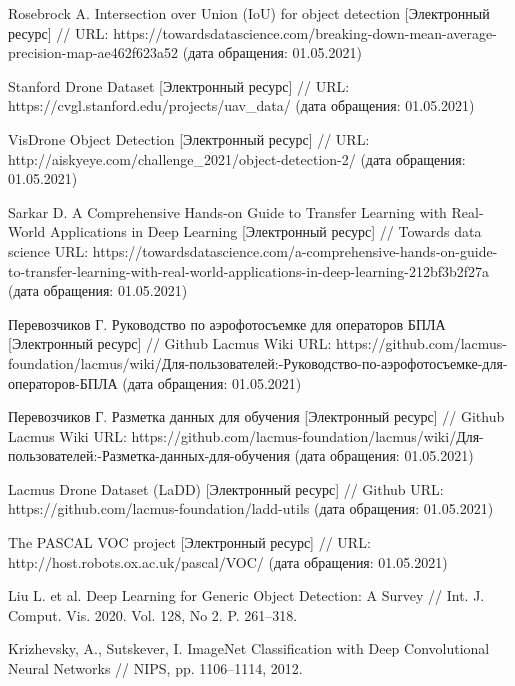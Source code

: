 \begin{thebibliography}{00}
    Rosebrock A. Intersection over Union (IoU) for object detection
    [Электронный ресурс] //
    URL: https://towardsdatascience.com/breaking-down-mean-average-precision-map-ae462f623a52
    (дата обращения: 01.05.2021)

    Stanford Drone Dataset
    [Электронный ресурс] //
    URL: https://cvgl.stanford.edu/projects/uav\_data/
    (дата обращения: 01.05.2021)

    VisDrone Object Detection
    [Электронный ресурс] //
    URL: http://aiskyeye.com/challenge\_2021/object-detection-2/
    (дата обращения: 01.05.2021)

    Sarkar D. A Comprehensive Hands-on Guide to Transfer Learning with Real-World Applications in Deep Learning
    [Электронный ресурс] //
    Towards data science
    URL: https://towardsdatascience.com/a-comprehensive-hands-on-guide-to-transfer-learning-with-real-world-applications-in-deep-learning-212bf3b2f27a
    (дата обращения: 01.05.2021)

    Перевозчиков Г. Руководство по аэрофотосъемке для операторов БПЛА
    [Электронный ресурс] //
    Github Lacmus Wiki
    URL: https://github.com/lacmus-foundation/lacmus/wiki/Для-пользователей:-Руководство-по-аэрофотосъемке-для-операторов-БПЛА
    (дата обращения: 01.05.2021)

    Перевозчиков Г. Разметка данных для обучения
    [Электронный ресурс] //
    Github Lacmus Wiki
    URL: https://github.com/lacmus-foundation/lacmus/wiki/Для-пользователей:-Разметка-данных-для-обучения
    (дата обращения: 01.05.2021)

    Lacmus Drone Dataset (LaDD)
    [Электронный ресурс] //
    Github
    URL: https://github.com/lacmus-foundation/ladd-utils
    (дата обращения: 01.05.2021)    

    The PASCAL VOC project
    [Электронный ресурс] //  
    URL: http://host.robots.ox.ac.uk/pascal/VOC/
    (дата обращения: 01.05.2021)

    Liu L. et al. 
    Deep Learning for Generic Object Detection: A Survey //
    Int. J. Comput. Vis. 2020. Vol. 128, No 2. P. 261–318.

    Krizhevsky, A., Sutskever, I.
    ImageNet Classification with Deep Convolutional Neural Networks //
    NIPS, pp. 1106–1114, 2012.


\end{thebibliography}
